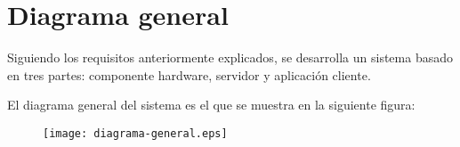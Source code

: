\section{Diagrama general}

Siguiendo los requisitos anteriormente explicados, se desarrolla un sistema basado en tres partes: componente hardware, servidor y aplicación cliente.

El diagrama general del sistema es el que se muestra en la siguiente figura:

\begin{figure}[H]
    \centering
    \texttt{[image: diagrama-general.eps]}
    \label{fig:diagrama-general}
\end{figure}